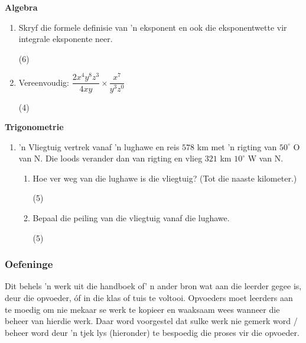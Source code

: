 \textbf{Algebra}
\begin{enumerate}[itemsep=0pt, label=\textbf{\arabic*}. ] 
\item Skryf die formele definisie van 'n eksponent en ook die eksponentwette vir integrale eksponente neer.\begin{flushright}(6)\end{flushright}
\item Vereenvoudig: $\dfrac{2x^4y^8z^3}{4xy} \times \dfrac{x^7}{y^3z^0}$	\begin{flushright}(4)\end{flushright}
\end{enumerate}

\textbf{Trigonometrie}
\begin{enumerate}[itemsep=0pt, label=\textbf{\arabic*}. ] 
\item
  'n Vliegtuig vertrek vanaf 'n lughawe en reis $578$ km met 'n
  rigting van $50^{\circ}$ O van N. Die loods verander dan van rigting
  en vlieg $321$ km $10^{\circ}$ W van N.
\begin{enumerate}[itemsep=0pt,label=\textbf{(\alph*)}]
\item Hoe ver weg van die lughawe is die vliegtuig? (Tot die naaste kilometer.) \begin{flushright}(5)\end{flushright}
\item Bepaal die peiling van die vliegtuig vanaf die lughawe.\begin{flushright}(5)\end{flushright}
\end{enumerate}
\end{enumerate}

\subsubsection{Oefeninge}
Dit behels 'n werk uit die handboek of' n ander bron wat aan die leerder gegee is, deur die opvoeder, óf in die klas of tuis te voltooi. Opvoeders moet leerders aan te moedig om nie mekaar se werk te kopieer en waaksaam wees wanneer die beheer van hierdie werk. Daar word voorgestel dat sulke werk nie gemerk word / beheer word deur 'n tjek lys (hieronder) te bespoedig die proses vir die opvoeder.

